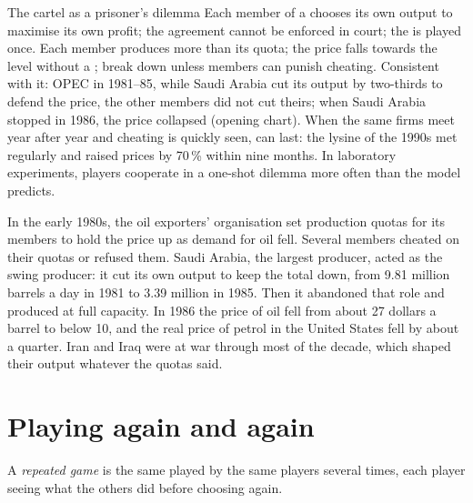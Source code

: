 \begin{model}{The cartel as a prisoner's dilemma}
\assumes Each member of a  chooses its own output to maximise its own profit; the agreement cannot be enforced in court; the  is played once.
\predicts Each member produces more than its quota; the price falls towards the level without a ;  break down unless members can punish cheating.
\tested Consistent with it: OPEC in 1981--85, while Saudi Arabia cut its output by two-thirds to defend the price, the other members did not cut theirs; when Saudi Arabia stopped in
  1986, the price collapsed (opening chart).
\breaks When the same firms meet year after year and cheating is quickly seen,  can last: the lysine  of the 1990s met regularly and raised prices
  by 70\,\% within nine months. In laboratory experiments, players cooperate in a one-shot dilemma more often than the model predicts.
\end{model}

\begin{record}[OPEC, 1981--86]
In the early 1980s, the oil exporters' organisation set production quotas for its members to hold the price up as demand for oil fell. Several members cheated on
their quotas or refused them. Saudi Arabia, the largest producer, acted as the swing producer: it cut its own output to keep the total down, from 9.81 million
barrels a day in 1981 to 3.39 million in 1985. Then it abandoned that role and produced at full capacity. In 1986 the price of oil fell from about 27 dollars a barrel
to below 10, and the real price of petrol in the United States fell by about a quarter. Iran and Iraq were at war through most of the decade, which shaped their
output whatever the quotas said.
\end{record}

\section{Playing again and again}\label{sec:g11:oligopoly-and-games:repeated}

\begin{definition}\label{def:g11:oligopoly-and-games:repeated-game}
A \emph{repeated game} is the same  played by the same players several times, each player seeing what the others did before choosing again.
\end{definition}


